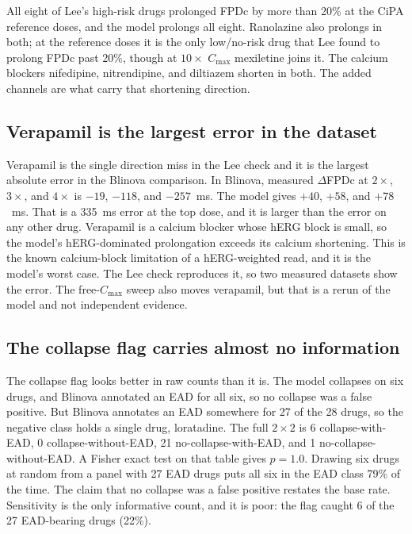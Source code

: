 \documentclass[preprint,12pt]{elsarticle}
\begin{document}
All eight of Lee's high-risk drugs prolonged FPDc by more than 20\% at the CiPA reference
doses, and the model prolongs all eight. Ranolazine also prolongs in both; at the
reference doses it is the only low/no-risk drug that Lee found to prolong FPDc past 20\%,
though at $10\times$ $C_{\mathrm{max}}$ mexiletine joins it. The calcium blockers
nifedipine, nitrendipine, and diltiazem shorten in both. The added channels are what
carry that shortening direction.

\subsection{Verapamil is the largest error in the dataset}

Verapamil is the single direction miss in the Lee check and it is the largest absolute
error in the Blinova comparison. In Blinova, measured $\Delta$FPDc at $2\times$, $3\times$,
and $4\times$ is $-19$, $-118$, and $-257$~ms. The model gives $+40$, $+58$, and
$+78$~ms. That is a 335~ms error at the top dose, and it is larger than the
error on any other drug. Verapamil is a calcium blocker whose hERG block is small, so the
model's hERG-dominated prolongation exceeds its calcium shortening. This is the known
calcium-block limitation of a hERG-weighted read, and it is the model's worst case. The
Lee check reproduces it, so two measured datasets show the error. The free-$C_{\mathrm{max}}$
sweep also moves verapamil, but that is a rerun of the model and not independent
evidence.

\subsection{The collapse flag carries almost no information}

The collapse flag looks better in raw counts than it is. The model collapses on six
drugs, and Blinova annotated an EAD for all six, so no collapse was a false positive. But
Blinova annotates an EAD somewhere for 27 of the 28 drugs, so the negative class holds a
single drug, loratadine. The full $2\times2$ is 6 collapse-with-EAD, 0
collapse-without-EAD, 21 no-collapse-with-EAD, and 1 no-collapse-without-EAD. A Fisher
exact test on that table gives $p = 1.0$. Drawing six drugs at random from a panel with
27 EAD drugs puts all six in the EAD class 79\% of the time. The claim that no collapse
was a false positive restates the base rate. Sensitivity is the only
informative count, and it is poor: the flag caught 6 of the 27 EAD-bearing drugs (22\%).
\end{document}
